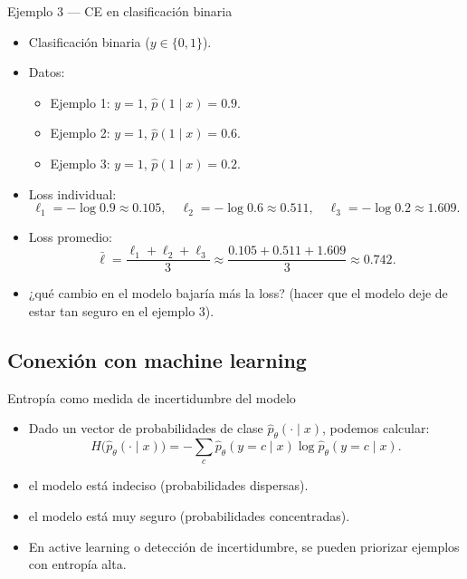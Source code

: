\begin{frame}{Ejemplo 3 — CE en clasificación binaria}
\begin{itemize}
  \item Clasificación binaria (\(y\in\{0,1\}\)).
  \item Datos:
  \begin{itemize}
    \item Ejemplo 1: \(y=1\), \(\hat p(1\mid x)=0.9\).
    \item Ejemplo 2: \(y=1\), \(\hat p(1\mid x)=0.6\).
    \item Ejemplo 3: \(y=1\), \(\hat p(1\mid x)=0.2\).
  \end{itemize}
  \item Loss individual:
  \[
    \ell_1 = -\log 0.9 \approx 0.105,\quad
    \ell_2 = -\log 0.6 \approx 0.511,\quad
    \ell_3 = -\log 0.2 \approx 1.609.
  \]
  \item Loss promedio:
  \[
    \bar\ell = \frac{\ell_1+\ell_2+\ell_3}{3}
    \approx \frac{0.105+0.511+1.609}{3}
    \approx 0.742.
  \]
  \item {} ¿qué cambio en el modelo bajaría más la loss? (hacer que el modelo deje de estar tan seguro en el ejemplo 3).
\end{itemize}
\end{frame}

\subsection[ML]{Conexión con machine learning}

\begin{frame}{Entropía como medida de incertidumbre del modelo}
\begin{itemize}
  \item Dado un vector de probabilidades de clase \(\hat p_\theta(\cdot\mid x)\), podemos calcular:
  \[
    H\big(\hat p_\theta(\cdot\mid x)\big)
    = -\sum_c \hat p_\theta(y=c\mid x)\log \hat p_\theta(y=c\mid x).
  \]
  \item {} el modelo está indeciso (probabilidades dispersas).
  \item {} el modelo está muy seguro (probabilidades concentradas).
  \item En active learning o detección de incertidumbre, se pueden priorizar ejemplos con entropía alta.
\end{itemize}
\end{frame}

